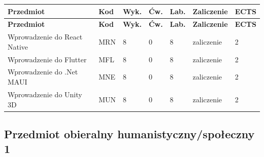 \documentclass[12pt,a4paper]{article}
\newcommand{\thdrule}{\noalign{\global\setlength{\extrarowheight}{0pt}}}
\newcommand{\thdend}{\noalign{\global\setlength{\extrarowheight}{4pt}}}
\begin{document}
{\scriptsize
\begin{longtable}{m{5.5cm}m{0.8cm}m{1cm}m{1cm}m{1cm}m{1.7cm}m{0.7cm}}
\thdrule\toprule
\rowcolor{pjatkRed}
{\color{white}\footnotesize\textbf{\vphantom{Ag}Przedmiot}} & {\color{white}\footnotesize\textbf{\vphantom{Ag}Kod}} & {\color{white}\footnotesize\textbf{\vphantom{Ag}Wyk.}} & {\color{white}\footnotesize\textbf{\vphantom{Ag}Ćw.}} & {\color{white}\footnotesize\textbf{\vphantom{Ag}Lab.}} & {\color{white}\footnotesize\textbf{\vphantom{Ag}Zaliczenie}} & {\color{white}\footnotesize\textbf{\vphantom{Ag}ECTS}} \\
\midrule\thdend
\endfirsthead
\thdrule\toprule
\rowcolor{pjatkRed}
{\color{white}\footnotesize\textbf{\vphantom{Ag}Przedmiot}} & {\color{white}\footnotesize\textbf{\vphantom{Ag}Kod}} & {\color{white}\footnotesize\textbf{\vphantom{Ag}Wyk.}} & {\color{white}\footnotesize\textbf{\vphantom{Ag}Ćw.}} & {\color{white}\footnotesize\textbf{\vphantom{Ag}Lab.}} & {\color{white}\footnotesize\textbf{\vphantom{Ag}Zaliczenie}} & {\color{white}\footnotesize\textbf{\vphantom{Ag}ECTS}} \\
\midrule\thdend
\endhead
\rowcolor{tableRowLight} Wprowadzenie do React Native & MRN & 8 & 0 & 8 & {\scriptsize zaliczenie} & 2 \\
\rowcolor{tableRowAlt} Wprowadzenie do Flutter & MFL & 8 & 0 & 8 & {\scriptsize zaliczenie} & 2 \\
\rowcolor{tableRowLight} Wprowadzenie do .Net MAUI & MNE & 8 & 0 & 8 & {\scriptsize zaliczenie} & 2 \\
\rowcolor{tableRowAlt} Wprowadzenie do Unity 3D & MUN & 8 & 0 & 8 & {\scriptsize zaliczenie} & 2 \\
\bottomrule
\end{longtable}}

\subsection*{Przedmiot obieralny humanistyczny/społeczny 1}
\end{document}
